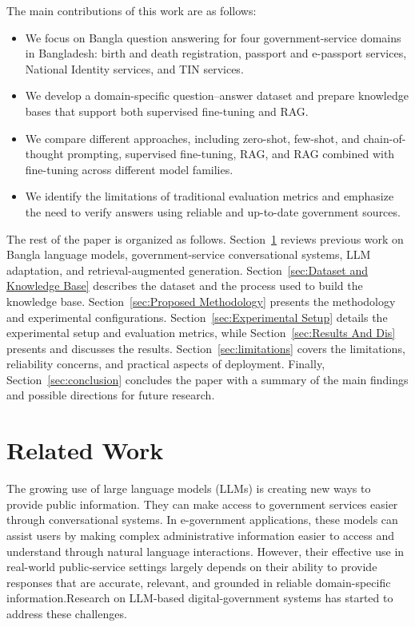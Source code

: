 \documentclass[10pt,journal,compsoc]{IEEEtran}
\begin{document}
The main contributions of this work are as follows:
\begin{itemize}
    \item We focus on Bangla question answering for four government-service domains in Bangladesh: birth and death registration, passport and e-passport services, National Identity services, and TIN services.

    \item We develop a domain-specific question--answer dataset and prepare knowledge bases that support both supervised fine-tuning and RAG.

    \item We compare different approaches, including zero-shot, few-shot, and chain-of-thought prompting, supervised fine-tuning, RAG, and RAG combined with fine-tuning across different model families.

    \item We identify the limitations of traditional evaluation metrics and emphasize the need to verify answers using reliable and up-to-date government sources.
\end{itemize}
The rest of the paper is organized as follows. Section~\ref{sec:Related_work} reviews previous work on Bangla language models, government-service conversational systems, LLM adaptation, and retrieval-augmented generation. Section~\ref{sec:Dataset and Knowledge Base} describes the dataset and the process used to build the knowledge base. Section~\ref{sec:Proposed Methodology} presents the methodology and experimental configurations. Section~\ref{sec:Experimental Setup} details the experimental setup and evaluation metrics, while Section~\ref{sec:Results And Dis} presents and discusses the results. Section~\ref{sec:limitations} covers the limitations, reliability concerns, and practical aspects of deployment. Finally, Section~\ref{sec:conclusion} concludes the paper with a summary of the main findings and possible directions for future research.


\section{Related Work}
\label{sec:Related_work}
       The growing use of large language models (LLMs) is creating new ways to provide public information. They can make access to government services easier through conversational systems. In e-government applications, these models can assist users by making complex administrative information easier to access and understand through natural language interactions. However, their effective use in real-world public-service settings largely depends on their ability to provide responses that are accurate, relevant, and grounded in reliable domain-specific information.Research on LLM-based digital-government systems has started to address these challenges.
       
\end{document}
